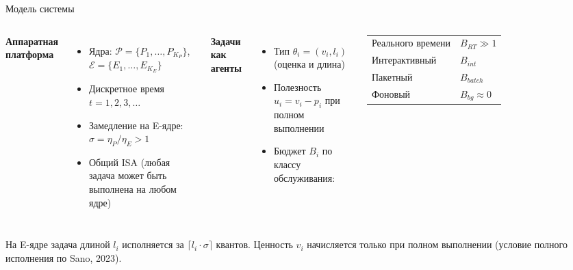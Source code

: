 \documentclass[aspectratio=169]{beamer}
\begin{document}
\begin{frame}{Модель системы}
        \begin{columns}[T]
                \textbf{Аппаратная платформа}
                \begin{itemize}
                        \item Ядра: $\mathcal{P} = \{P_1,\ldots,P_{K_P}\}$,\;
                                $\mathcal{E} = \{E_1,\ldots,E_{K_E}\}$
                        \item Дискретное время $t = 1,2,3,\ldots$
                        \item Замедление на E-ядре:
                                $\sigma = \eta_P/\eta_E > 1$
                        \item Общий ISA (любая задача может быть
                                выполнена на любом ядре)
                \end{itemize}

                \textbf{Задачи как агенты}
                \begin{itemize}
                        \item Тип $\theta_i = (v_i, l_i)$ (оценка и длина)
                        \item Полезность $u_i = v_i - p_i$ при полном
                                выполнении
                        \item Бюджет $B_i$ по классу обслуживания:
                \end{itemize}
                \vspace{0.2em}
                {\footnotesize
                        \begin{tabular}{@{}ll@{}}
                                Реального времени & $B_{RT} \gg 1$ \\
                                Интерактивный     & $B_{int}$ \\
                                Пакетный          & $B_{batch}$ \\
                                Фоновый           & $B_{bg} \approx 0$
                \end{tabular}}
        \end{columns}

        \vspace{0.4em}
        \begin{shadowbox}
                \footnotesize На E-ядре задача длиной $l_i$ исполняется за
                $\lceil l_i \cdot \sigma \rceil$ квантов.
                Ценность $v_i$ начисляется только при полном выполнении
                (условие полного исполнения по Sano, 2023).
        \end{shadowbox}
\end{frame}
\end{document}
